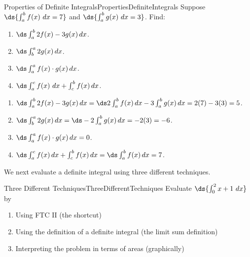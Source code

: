 \begin{example}{Properties of Definite Integrals}{PropertiesDefiniteIntegrals}
Suppose $\ds{\int_a^b f(x)~dx=7}$ and $\ds{\int_a^b g(x)~dx=3}$. Find:
\begin{multicols}{2}
\begin{enumerate}
	\item	$\ds\int_a^b 2f(x)-3g(x)\,dx$.
	\item	$\ds\int_{b}^{a} 2g(x)\,dx$.
	\item	$\ds\int_a^a f(x)\cdot g(x)\,dx$.
	\item	$\ds\int_a^c f(x)~dx+\int_c^b f(x)\,dx$.
\end{enumerate}
\end{multicols}
\vspace{5mm}
\end{example}
\begin{solution}
\begin{enumerate}
	\item	$\ds\int_a^b 2f(x)-3g(x)\,dx=\ds 2\int_a^b f(x)\,dx-3\int_a^b g(x)\,dx=2(7)-3(3)=5$.
	\item	$\ds\int_{b}^{a} 2g(x)\,dx=\ds -2\int_{a}^{b} g(x)\,dx=-2(3)=-6$.
	\item	$\ds\int_a^a f(x)\cdot g(x)\,dx=0$.
	\item	$\ds\int_a^c f(x)\,dx+\int_c^b f(x)\,dx=\ds\int_a^b f(x)\,dx=7$.
\end{enumerate}
\end{solution}

We next evaluate a definite integral using three different techniques.

\begin{example}{Three Different Techniques}{ThreeDifferentTechniques}
Evaluate $\ds{\int_0^2 x+1~dx}$ by
\begin{enumerate}
\item Using FTC II (the shortcut)
\item Using the definition of a definite integral (the limit sum definition)
\item Interpreting the problem in terms of areas (graphically)
\end{enumerate}
\end{example}

